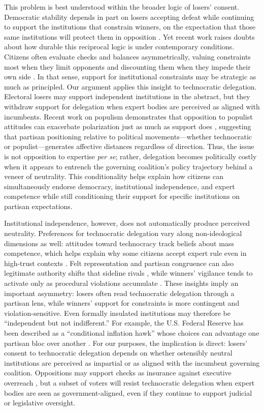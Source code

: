 \documentclass[11pt]{article}\usepackage[]{graphicx}\usepackage[]{xcolor}
\begin{document}
This problem is best understood within the broader logic of losers' consent. Democratic stability depends in part on losers accepting defeat while continuing to support the institutions that constrain winners, on the expectation that those same institutions will protect them in opposition \parencite{Pilet:2023}. Yet recent work raises doubts about how durable this reciprocal logic is under contemporary conditions. Citizens often evaluate checks and balances asymmetrically, valuing constraints most when they limit opponents and discounting them when they impede their own side \parencite{Arbatli:2021}. In that sense, support for institutional constraints may be strategic as much as principled. Our argument applies this insight to technocratic delegation. Electoral losers may support independent institutions in the abstract, but they withdraw support for delegation when expert bodies are perceived as aligned with incumbents. Recent work on populism demonstrates that opposition to populist attitudes can exacerbate polarization just as much as support does \parencite[17]{Koiranen2025}, suggesting that partisan positioning relative to political movements---whether technocratic or populist---generates affective distances regardless of direction. Thus, the issue is not opposition to expertise \emph{per se}; rather, delegation becomes politically costly when it appears to entrench the governing coalition's policy trajectory behind a veneer of neutrality. This conditionality helps explain how citizens can simultaneously endorse democracy, institutional independence, and expert competence while still conditioning their support for specific institutions on partisan expectations.

Institutional independence, however, does not automatically produce perceived neutrality. Preferences for technocratic delegation vary along non-ideological dimensions as well: attitudes toward technocracy track beliefs about mass competence, which helps explain why some citizens accept expert rule even in high-trust contexts \parencite{Rapeli2023}. Felt representation and partisan congruence can also legitimate authority shifts that sideline rivals \parencite{Singer2018}, while winners' vigilance tends to activate only as procedural violations accumulate \parencite{Werner2025}. These insights imply an important asymmetry: losers often read technocratic delegation through a partisan lens, while winners' support for constraints is more contingent and violation-sensitive. Even formally insulated institutions may therefore be ``independent but not indifferent.'' For example, the U.S. Federal Reserve has been described as a ``conditional inflation hawk'' whose choices can advantage one partisan bloc over another \parencite{Clarks2013}. For our purposes, the implication is direct: losers' consent to technocratic delegation depends on whether ostensibly neutral institutions are perceived as impartial or as aligned with the incumbent governing coalition. Oppositions may support checks as insurance against executive overreach \parencite{Capoccia2007a}, but a subset of voters will resist technocratic delegation when expert bodies are seen as government-aligned, even if they continue to support judicial or legislative oversight.
\end{document}
